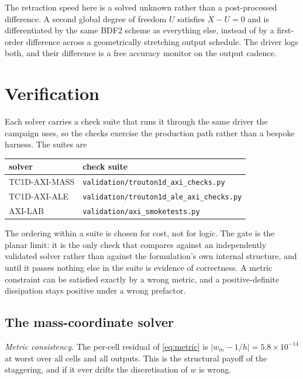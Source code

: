 \documentclass[11pt,a4paper]{article}
\newcommand{\MASS}{\textsf{TC1D-AXI-MASS}}
\newcommand{\ALE}{\textsf{TC1D-AXI-ALE}}
\newcommand{\LAB}{\textsf{AXI-LAB}}
\begin{document}
The retraction speed here is a solved unknown rather than a post-processed
difference. A second global degree of freedom $U$ satisfies $\dot{X} - U = 0$
and is differentiated by the same BDF2 scheme as everything else, instead of by
a first-order difference across a geometrically stretching output schedule. The
driver logs both, and their difference is a free accuracy monitor on the output
cadence.

\section{Verification}
\label{sec:verification}

Each solver carries a check suite that runs it through the same driver the
campaign uses, so the checks exercise the production path rather than a bespoke
harness. The suites are

\begin{center}
\small
\begin{tabular}{@{}ll@{}}
\toprule
solver & check suite \\
\midrule
\MASS & \texttt{validation/trouton1d\_axi\_checks.py} \\
\ALE  & \texttt{validation/trouton1d\_ale\_axi\_checks.py} \\
\LAB  & \texttt{validation/axi\_smoketests.py} \\
\bottomrule
\end{tabular}
\end{center}

The ordering within a suite is chosen for cost, not for logic. The gate is the
planar limit: it is the only check that compares against an independently
validated solver rather than against the formulation's own internal structure,
and until it passes nothing else in the suite is evidence of correctness. A
metric constraint can be satisfied exactly by a wrong metric, and a
positive-definite dissipation stays positive under a wrong prefactor.

\subsection{The mass-coordinate solver}
\label{sec:verif-mass}

\emph{Metric consistency.} The per-cell residual of \eqref{eq:metric} is
$|w_{m}-1/h| = 5.8\times10^{-14}$ at worst over all cells and all outputs. This
is the structural payoff of the staggering, and if it ever drifts the
discretisation of $w$ is wrong.
\end{document}
